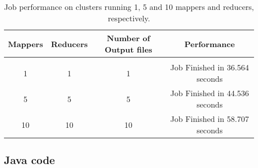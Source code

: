 \documentclass{article} %
\begin{document}
\begin{table}[!htbp]
\caption{Job performance on clusters running 1, 5 and 10 mappers and reducers, respectively.}
\label{table:2}
\begin{center}
\begin{tabular}{c c c c}
\multicolumn{1}{c}{\bf Mappers} & \multicolumn{1}{c}{\bf Reducers} & \multicolumn{1}{c}{\bf Number of Output files} & \multicolumn{1}{c}{\bf Performance}
\\ \hline \\
1 & 1 & 1 & Job Finished in 36.564 seconds\\
5 & 5 & 5 & Job Finished in 44.536 seconds\\
10 & 10 & 10 & Job Finished in 58.707 seconds

\end{tabular}
\end{center}
\end{table}

\subsection*{Java code} 
\end{document}
